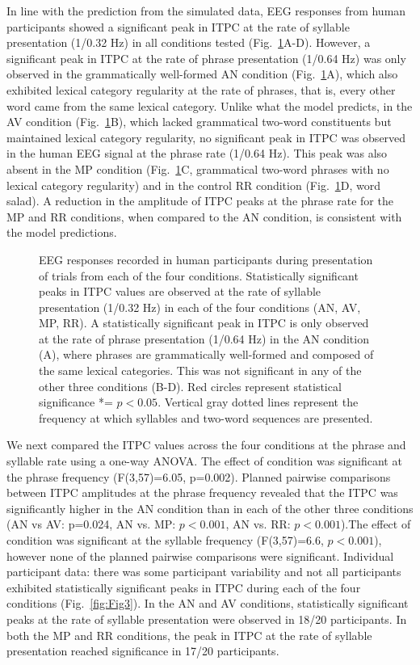 \documentclass[10pt,letterpaper]{article}
\begin{document}
In line with the prediction from the simulated data, EEG responses
from human participants showed a significant peak in ITPC at the rate
of syllable presentation (1/0.32 Hz) in all conditions tested
(Fig.~\ref{fig:Fig2}A-D). However, a significant peak in ITPC at the
rate of phrase presentation (1/0.64 Hz) was only observed in the
grammatically well-formed AN condition (Fig.~\ref{fig:Fig2}A), which
also exhibited lexical category regularity at the rate of phrases,
that is, every other word came from the same lexical category. Unlike
what the model predicts, in the AV condition (Fig.~\ref{fig:Fig2}B),
which lacked grammatical two-word constituents but maintained lexical
category regularity, no significant peak in ITPC was observed in the
human EEG signal at the phrase rate (1/0.64 Hz). This peak was also
absent in the MP condition (Fig.~\ref{fig:Fig2}C, grammatical two-word
phrases with no lexical category regularity) and in the control RR
condition (Fig.~\ref{fig:Fig2}D, word salad). A reduction in the
amplitude of ITPC peaks at the phrase rate for the MP and RR
conditions, when compared to the AN condition, is consistent with the
model predictions.


\begin{figure}[tbhp]

\caption{EEG responses recorded in human participants during presentation of trials from each of the four conditions. Statistically significant peaks in ITPC values are observed at the rate of syllable presentation (1/0.32 Hz) in each of the four conditions (AN, AV, MP, RR). A statistically significant peak in ITPC is only observed at the rate of phrase presentation (1/0.64 Hz) in the AN condition (A), where phrases are grammatically well-formed and composed of the same  lexical categories. This was not significant in any of the other three conditions (B-D). Red circles represent statistical significance *= $p<0.05$. Vertical gray dotted lines represent the frequency at which syllables and two-word sequences are presented.}
\label{fig:Fig2}
\end{figure}
\color{blue}
We next compared the ITPC values across the four conditions at the phrase and syllable rate using a one-way ANOVA. The effect of condition was significant at the phrase frequency (F(3,57)=6.05, p=0.002). Planned pairwise comparisons between ITPC amplitudes at the phrase frequency revealed that the ITPC was significantly higher in the AN condition than in each of the other three conditions (AN vs AV: p=0.024, AN vs. MP: $p<0.001$, AN vs. RR: $p<0.001$).The effect of condition was significant at the syllable frequency (F(3,57)=6.6, $p<0.001$), however none of the planned pairwise comparisons were significant. 
\color{black}
Individual participant data: there was some participant variability and not all participants exhibited statistically significant peaks in ITPC during each of the four conditions (Fig.~\ref{fig:Fig3}). In the AN and AV conditions, statistically significant peaks at the rate of syllable presentation were observed in 18/20 participants. In both the MP and RR conditions, the peak in ITPC at the rate of syllable presentation reached significance in 17/20 participants.
\end{document}
